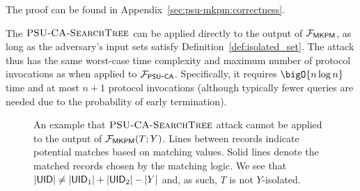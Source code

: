 The proof can be found in Appendix~\ref{sec:psu-mkpm:correctness}.

 The $\textsc{PSU\mbox{-}CA\mbox{-}SearchTree}{}$ can be applied
directly to the output of $\mathcal{F}_{\mathsf{MKPM}}$, as long as the adversary's input sets
satisfy Definition~\ref{def:isolated_set}. The attack thus has the same worst-case time complexity and maximum number of protocol invocations as when
applied to $\mathcal{F}_{\mathsf{PSU\mbox{-}CA}}$. Specifically, it requires $\bigO{n\log n}$ time and
at most $n + 1$ protocol invocations (although typically fewer queries are
needed due to the probability of early termination).

\begin{figure}
  \centering
  
  \caption{An example that $\textsc{PSU\mbox{-}CA\mbox{-}SearchTree}{}$ attack cannot be applied to the output of $\mathcal{F}_{\mathsf{MKPM}}(T;Y)$. Lines between records indicate potential matches based on matching values. Solid lines denote the matched records
  chosen by the matching logic. We see that
    $|\mathsf{UID}| \neq |\mathsf{UID}_1| + |\mathsf{UID}_2| - |Y|$ and, as such, $T$ is not
    $Y$-isolated.}
  \label{fig:MPMK_PSUCA_counterexample}
\end{figure}
